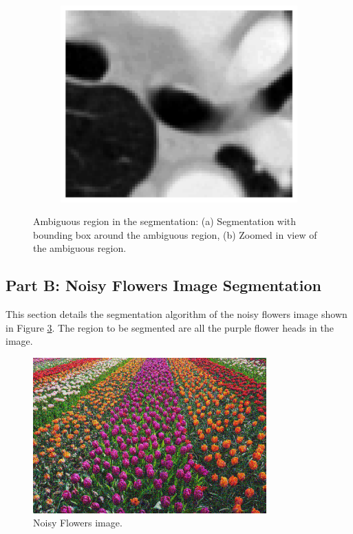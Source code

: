 \documentclass[11pt]{article}
\begin{document}
\begin{figure}[H]
\begin{subfigure}{.4\textwidth}
        \includegraphics[width=\linewidth]{figs/q1a_zoomed_region.png}  %
        \caption{}
        \label{fig:q1a_zoomed_region}
    \end{subfigure}%
    \caption{Ambiguous region in the segmentation: (a) Segmentation with bounding box around the ambiguous region, (b) Zoomed in view of the ambiguous region.}
    \label{fig:q1a_ambiguity}
\end{figure}

\subsection{Part B: Noisy Flowers Image Segmentation}
This section details the segmentation algorithm of the noisy flowers image shown in Figure \ref{fig:flowers_image}. The region to be segmented are all the purple flower heads in the image.

\begin{figure}[H]
    \centering
    \includegraphics[width=0.8\textwidth]{../data/noisy_flower.jpg}
    \caption{Noisy Flowers image.}
    \label{fig:flowers_image}
\end{figure}
\end{document}
